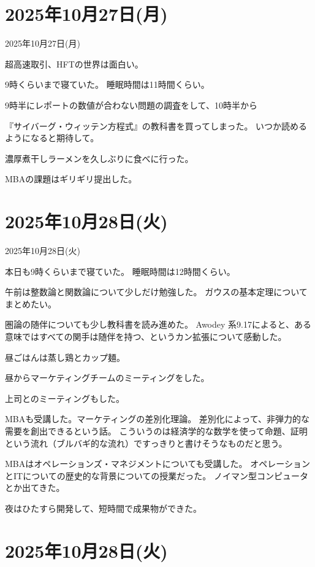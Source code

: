 \documentclass[dvipdfmx, autodetect-engine, aspectratio=169, 10.5pt]{beamer}
\begin{document}
\section{2025年10月27日(月)}

\begin{frame}{2025年10月27日(月)}

超高速取引、HFTの世界は面白い。

9時くらいまで寝ていた。
睡眠時間は11時間くらい。

9時半にレポートの数値が合わない問題の調査をして、10時半から

『サイバーグ・ウィッテン方程式』の教科書を買ってしまった。
いつか読めるようになると期待して。

濃厚煮干しラーメンを久しぶりに食べに行った。

MBAの課題はギリギリ提出した。
\end{frame}

\section{2025年10月28日(火)}

\begin{frame}{2025年10月28日(火)}

本日も9時くらいまで寝ていた。
睡眠時間は12時間くらい。

午前は整数論と関数論について少しだけ勉強した。
ガウスの基本定理についてまとめたい。

圏論の随伴についても少し教科書を読み進めた。
Awodey 系9.17によると、ある意味ではすべての関手は随伴を持つ、というカン拡張について感動した。

昼ごはんは蒸し鶏とカップ麺。

昼からマーケティングチームのミーティングをした。

上司とのミーティングもした。

MBAも受講した。マーケティングの差別化理論。
差別化によって、非弾力的な需要を創出できるという話。
こういうのは経済学的な数学を使って命題、証明という流れ（ブルバギ的な流れ）ですっきりと書けそうなものだと思う。

MBAはオペレーションズ・マネジメントについても受講した。
オペレーションとITについての歴史的な背景についての授業だった。
ノイマン型コンピュータとか出てきた。

夜はひたすら開発して、短時間で成果物ができた。
\end{frame}

\section{2025年10月28日(火)}
\end{document}
